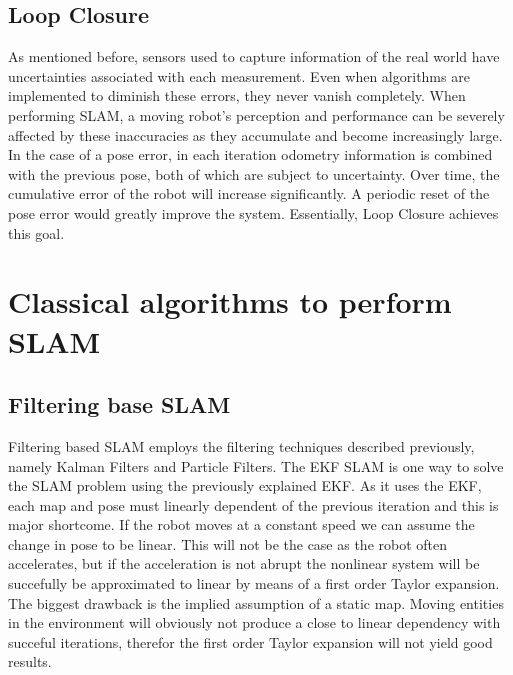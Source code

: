 \subsection{Loop Closure}

As mentioned before, sensors used to capture information of the real world have uncertainties associated with each measurement. Even when algorithms are implemented to diminish these errors, they never vanish completely. When performing \acs*{SLAM}, a moving robot's perception and performance can be severely affected by these inaccuracies as they accumulate and become increasingly large. In the case of a pose error, in each iteration odometry information is combined with the previous pose, both of which are subject to uncertainty. Over time, the cumulative error of the robot will increase significantly. A periodic reset of the pose error would greatly improve the system. Essentially, Loop Closure achieves this goal.

\section{Classical algorithms to perform \acs*{SLAM}}

\subsection{Filtering base SLAM}

Filtering based \acs*{SLAM} employs the filtering techniques described previously, namely Kalman Filters and Particle Filters. The \acs*{EKF} \acs*{SLAM} is one way to solve the \acs*{SLAM} problem using the previously explained \acl*{EKF}. As it uses the \acs*{EKF}, each map and pose must linearly dependent of the previous iteration and this is major shortcome. If the robot moves at a constant speed we can assume the change in pose to be linear. This will not be the case as the robot often accelerates, but if the acceleration is not abrupt the nonlinear system will be succefully be approximated to linear by means of a first order Taylor expansion. The biggest drawback is the implied assumption of a static map. Moving entities in the environment will obviously not produce a close to linear dependency with succeful iterations, therefor the first order Taylor expansion will not yield good results. 


